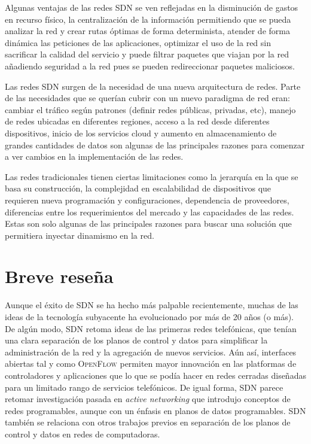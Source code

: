 \documentclass[10pt,journal,compsoc]{IEEEtran}
\begin{document}
Algunas ventajas de las redes SDN se ven reflejadas en la disminución de gastos en recurso físico, la centralización de la información permitiendo que se pueda analizar la red y crear rutas óptimas de forma determinista, atender de forma dinámica las peticiones de las aplicaciones, optimizar el uso de la red sin sacrificar la calidad del servicio y puede filtrar paquetes que viajan por la red añadiendo seguridad a la red pues se pueden redireccionar paquetes maliciosos.

Las redes SDN surgen de la necesidad de una nueva arquitectura de redes. Parte de las necesidades que se querían cubrir con un nuevo paradigma de red eran: cambiar el tráfico según patrones (definir redes públicas, privadas, etc), manejo de redes ubicadas en diferentes regiones, acceso a la red desde diferentes dispositivos, inicio de los servicios cloud y aumento en almacenamiento de grandes cantidades de datos son algunas de las principales razones para comenzar a ver cambios en la implementación de las redes. 

Las redes tradicionales tienen ciertas limitaciones como la jerarquía en la que se basa su construcción, la complejidad en escalabilidad de dispositivos que requieren nueva programación y configuraciones, dependencia de proveedores, diferencias entre los requerimientos del mercado y  las capacidades de las redes. Estas son solo algunas de las principales razones para buscar una solución que permitiera inyectar dinamismo en la red. 

\section{Breve reseña}
Aunque el éxito de SDN se ha hecho más palpable recientemente, muchas de las ideas de la tecnología subyacente ha evolucionado por más de 20 años (o más). De algún modo, SDN retoma ideas de las primeras redes telefónicas, que tenían una clara separación de los planos de control y datos para simplificar la administración de la red y la agregación de nuevos servicios. Aún así, interfaces abiertas tal y como \textsc{OpenFlow} permiten mayor innovación en las platformas de controladores y aplicaciones que lo que se podía hacer en redes cerradas diseñadas para un limitado rango de servicios telefónicos. De igual forma, SDN parece retomar investigación pasada en \emph{active networking} que introdujo conceptos de redes programables, aunque con un énfasis en planos de datos programables. SDN también se relaciona con otros trabajos previos en separación de los planos de control y datos en redes de computadoras.
\end{document}
